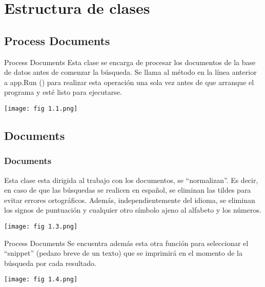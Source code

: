 \section{Estructura de clases}

\subsection{Process Documents}
\begin{frame}{Process Documents}
    Esta clase se encarga de procesar los documentos de la base de datos antes de comenzar la búsqueda.
    Se llama al método en la línea anterior a app.Run () para realizar esta operación una sola vez antes de que
    arranque el programa y esté listo para ejecutarse.

\pause

    \begin{center}
        \texttt{[image: fig 1.1.png]}\\
    \end{center}
\end{frame}  

\subsection{Documents}

\begin{frame}
    \frametitle{Documents}
    Esta clase esta dirigida al trabajo con los documentos, se “normalizan”. Es decir, en caso de que las
búsquedas se realicen en español, se eliminan las tildes para evitar errores ortográficos. Además, independientemente del idioma, se eliminan los signos de puntuación y cualquier otro símbolo ajeno al alfabeto 
y los números.

\pause

\begin{center}
	\texttt{[image: fig 1.3.png]}\\
\end{center}
\end{frame}

\begin{frame}{Process Documents}
    Se encuentra además esta otra función para seleccionar el “snippet” (pedazo breve de un texto) que se 
    imprimirá en el momento de la búsqueda por cada resultado.

\pause

\begin{center}
	\texttt{[image: fig 1.4.png]}\\
\end{center}
\end{frame}

